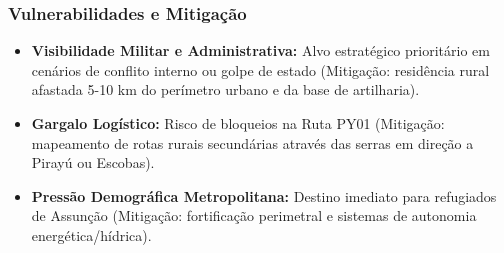 \subsubsection{Vulnerabilidades e
Mitigação}

\begin{itemize}
\tightlist
\item
  \textbf{Visibilidade Militar e Administrativa:} Alvo estratégico
  prioritário em cenários de conflito interno ou golpe de estado
  (Mitigação: residência rural afastada 5-10 km do perímetro urbano e da
  base de artilharia).
\item
  \textbf{Gargalo Logístico:} Risco de bloqueios na Ruta PY01
  (Mitigação: mapeamento de rotas rurais secundárias através das serras
  em direção a Pirayú ou Escobas).
\item
  \textbf{Pressão Demográfica Metropolitana:} Destino imediato para
  refugiados de Assunção (Mitigação: fortificação perimetral e sistemas
  de autonomia energética/\allowbreak hídrica).
\end{itemize}

